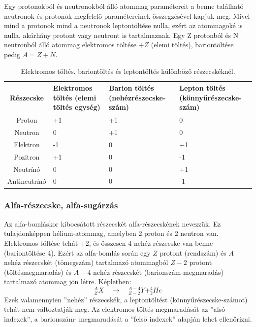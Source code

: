 \documentclass[../main.tex]{subfiles}
\begin{document}
Egy protonokból és neutronokból álló atommag paramétereit a benne található neutronok és protonok megfelelő paramétereinek összegzésével kapjuk meg. Mivel mind a
protonok mind a neutronok leptontöltése nulla, ezért az atommagoké is nulla, akárhány
protont vagy neutront is tartalmaznak. Egy Z protonból és N neutronból álló atommag
elektromos töltése $+Z$ (elemi töltés), bariontöltése pedig $A = Z + N$.
\begin{table}[H]
    \centering
    \begin{tabular}{|c|p{3cm}|p{3cm}|p{3cm}|}
        \hline
        Részecske & Elektromos töltés (elemi töltés egység) & Barion töltés (nehézrészecske-szám) & Lepton töltés (könnyűrészecske-szám) \\
        \hline
        Proton & +1 & +1 & 0 \\
        \hline
        Neutron & 0 & +1 & 0 \\
        \hline
        Elektron & -1 & 0 & +1 \\
        \hline
        Pozitron & +1 & 0 & -1 \\
        \hline
        Neutrínó & 0 & 0 & +1 \\
        \hline
        Antineutrínó & 0 & 0 & -1 \\
        \hline
    \end{tabular}
    \caption{Elektromos töltés, bariontöltés és leptontöltés különböző részecskéknél.}
\end{table}

\subsubsection{Alfa-részecske, alfa-sugárzás}
Az alfa-bomláskor kibocsátott részecskét alfa-részecskének nevezzük. Ez tulajdonképpen
hélium-atommag, amelyben 2 proton és 2 neutron van. Elektromos töltése tehát +2,
és összesen 4 nehéz részecske van benne (bariontöltése 4). Ezért az alfa-bomlás során
egy $Z$ protont (rendszám) és $A$ nehéz részecskét (tömegszám) tartalmazó atommagból
$Z - 2$ protont (töltésmegmaradás) és $A - 4$ nehéz részecskét (barionszám-megmaradás)
tartalmazó atommag jön létre. Képletben:
\begin{equation}
    ^A_Z X \quad \rightarrow \quad ^{A-4}_{Z-2} Y + ^4_2 He
\end{equation}
Ezek valamennyien ”nehéz” részecskék, a leptontöltést (könnyűrészecske-számot) tehát
nem változtatják meg. Az elektromos-töltés megmaradását az ”alsó indexek”, a barionszám-
megmaradását a ”felső indexek” alapján lehet ellenőrizni.
\end{document}
